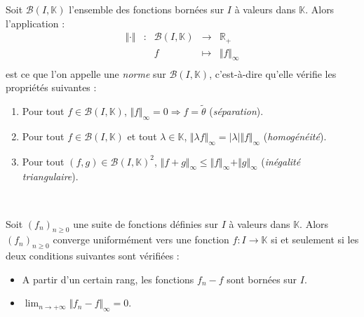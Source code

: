 \documentclass[french,11pt,twoside]{VcCours}
\begin{document}
\begin{Theoreme}{} Soit $\mathcal{B}(I,\mathbb{K})$ l'ensemble des fonctions bornées sur $I$ à valeurs dans $\mathbb{K}$. Alors l'application :
$$ \begin{array}{ccccl}
\Vert \cdot \Vert & : & \mathcal{B}(I, \mathbb{K}) & \rightarrow & \mathbb{R}_+ \\
& & f & \mapsto & \Vert f \Vert_{\infty} \\
\end{array}$$
est ce que l'on appelle une \emph{norme} sur $\mathcal{B}(I,\mathbb{K})$, c'est-à-dire qu'elle vérifie les propriétés suivantes : 
\begin{enumerate}
\item Pour tout $f \in \mathcal{B}(I,\mathbb{K})$, $\Vert f \Vert_{\infty} = 0 \Longrightarrow f= \tilde{\theta}$ (\emph{séparation}).
\item Pour tout $f  \in \mathcal{B}(I,\mathbb{K})$ et tout $\lambda \in \mathbb{K}$, $\Vert \lambda f \Vert_{\infty} = \vert \lambda \vert \Vert f \Vert_{\infty}$ (\emph{homogénéité}).
\item Pour tout $(f,g) \in \mathcal{B}(I,\mathbb{K})^2$, $\Vert f+g \Vert_{\infty} \leq \Vert f\Vert_{\infty} + \Vert g \Vert_{\infty}$ (\emph{inégalité triangulaire}).
\end{enumerate}
\end{Theoreme}
\begin{Demonstration}{}

\vspace*{10cm}

\newpage

$\phantom{test}$

\vspace*{5cm}
\end{Demonstration}

\begin{Proposition}{}  Soit $(f_n)_{n \geq 0}$ une suite de fonctions définies sur $I$ à valeurs dans $\mathbb{K}$. Alors $(f_n)_{n \geq 0}$ converge uniformément vers une fonction $f : I \rightarrow \mathbb{K}$ si et seulement si les deux conditions suivantes sont vérifiées :  

\begin{itemize}
\item A partir d'un certain rang, les fonctions $f_n-f$ sont bornées sur $I$.
\item $\lim_{n \rightarrow + \infty} \Vert f_n - f  \Vert_{\infty} =0$.
\end{itemize}
\end{Proposition}
\end{document}
